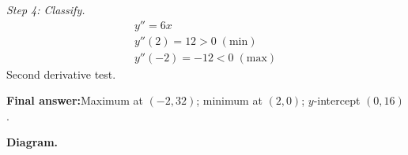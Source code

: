 \documentclass[11pt]{article}
\begin{document}
\textit{Step 4: Classify.}
\[\begin{gathered}
y'' = 6x \\ y''(2) = 12 > 0\; (\text{min}) \\ y''(-2) = -12 < 0\; (\text{max})
\end{gathered}\]
Second derivative test.

\begin{answerbox}
\textbf{Final answer:}\quad Maximum at \(\displaystyle  (-2, 32) \); minimum at \(\displaystyle  (2, 0) \); \(\displaystyle  y \)-intercept \(\displaystyle  (0, 16) \).
\end{answerbox}
\textbf{Diagram.}

\begin{center}
\end{center}
\end{document}
